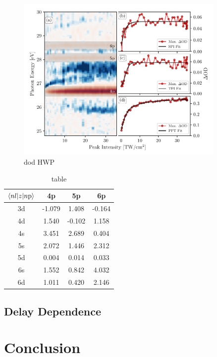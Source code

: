 \begin{figure}
	\centering
	\includegraphics[width=0.9\textwidth]{figures/ATS/np_intensity_dep.pdf}
	\caption[Typical harmonic spectrum used in ATS experiments]{dod HWP}
	\label{fig:np_intensity_dep}
\end{figure}



\begin{table}[]
	\centering
	\begin{tabular}{cccc}
		\toprule
		$\braket{nl|z|n\mathrm{p}}$ &     4p &     5p &     6p \\
		\midrule
		3d & -1.079 &  1.408 & -0.164 \\
		4d &  1.540 & -0.102 &  1.158 \\
		4s &  3.451 &  2.689 &  0.404 \\
		5s &  2.072 &  1.446 &  2.312 \\
		5d &  0.004 &  0.014 &  0.033 \\
		6s &  1.552 &  0.842 &  4.032 \\
		6d &  1.011 &  0.420 &  2.146 \\
		\bottomrule
	\end{tabular}
	\caption{table}
	\label{tab:matrix_elements}
\end{table}


\subsection{Delay Dependence}
\label{sec:ATS_ar_delay}

\section{Conclusion}
\label{sec:ATS_conclusion}

